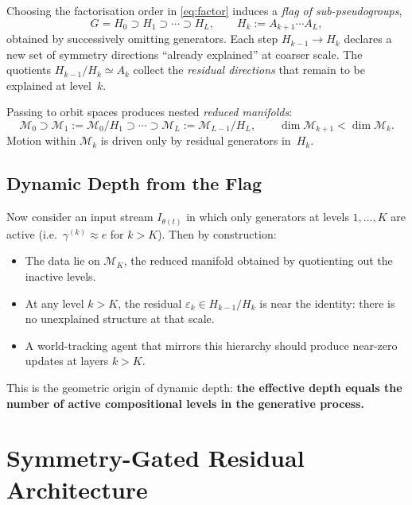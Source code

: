 \documentclass[11pt,a4paper]{article}
\newcommand{\cM}{\mathcal{M}}
\begin{document}
Choosing the factorisation order in \eqref{eq:factor}
induces a \emph{flag of sub-pseudogroups},
\begin{equation}\label{eq:flag}
  G = H_0 \supset H_1 \supset \cdots \supset H_L,
  \qquad H_k := A_{k+1}\cdots A_L,
\end{equation}
obtained by successively omitting generators.
Each step $H_{k-1}\to H_k$ declares a new set of symmetry
directions ``already explained'' at coarser scale.
The quotients $H_{k-1}/H_k \simeq A_k$ collect the
\emph{residual directions} that remain to be explained at level~$k$.

Passing to orbit spaces produces nested \emph{reduced manifolds}:
\begin{equation}\label{eq:nested}
  \cM_0 \supset \cM_1 := \cM_0/H_1 \supset \cdots
  \supset \cM_L := \cM_{L-1}/H_L,
  \qquad \dim\cM_{k+1} < \dim\cM_k.
\end{equation}
Motion within $\cM_k$ is driven only by
residual generators in~$H_k$.

\subsection{Dynamic Depth from the Flag}\label{sec:dynamic}

Now consider an input stream $I_{\theta(t)}$ in which only
generators at levels $1,\ldots,K$ are active
(i.e.\ $\gamma^{(k)}\approx e$ for $k>K$).
Then by construction:

\begin{itemize}[nosep]
\item The data lie on $\cM_K$, the reduced manifold obtained
  by quotienting out the inactive levels.
\item At any level $k>K$, the residual
  $\varepsilon_k\in H_{k-1}/H_k$ is near the identity:
  there is no unexplained structure at that scale.
\item A world-tracking agent that mirrors this hierarchy
  should produce near-zero updates at layers $k>K$.
\end{itemize}

This is the geometric origin of dynamic depth:
\textbf{the effective depth equals the number of active
compositional levels in the generative process.}

\section{Symmetry-Gated Residual Architecture}\label{sec:arch}
\end{document}
